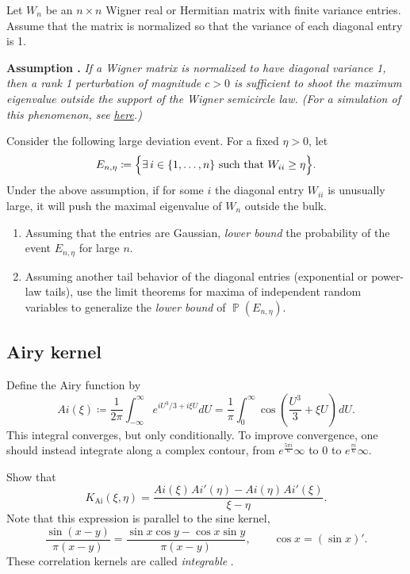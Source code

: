 \documentclass[letterpaper,11pt,oneside,reqno]{article}
\numberwithin{equation}{section}
\newcommand{\ssp}{\hspace{1pt}}
\theoremstyle{definition}
\begin{document}
Let \(W_n\) be an \(n\times n\) Wigner real or Hermitian matrix with finite variance entries. Assume that the matrix is normalized so that the variance of each diagonal entry is 1.

\medskip

\textbf{Assumption \cite{BBP2005phase}.} \textit{If a Wigner matrix is normalized to have diagonal variance 1, then a rank 1 perturbation of magnitude $c>0$ is sufficient to shoot the maximum eigenvalue outside the support of the Wigner semicircle law. (For a simulation of this phenomenon, see \href{https://lpetrov.cc/simulations/2025-01-28-bbp-transition/}{here}.)}

\medskip

Consider the following large deviation event. For a fixed \(\eta>0\), let
\[
E_{n,\eta}\coloneqq \Bigl\{ \exists\, i\in\{1,\dots,n\} \text{ such that } W_{ii}\ge \eta \Bigr\}.
\]
Under the above assumption, if for some \(i\) the diagonal
entry \(W_{ii}\) is unusually large, it will push the
maximal eigenvalue of \(W_n\) outside the bulk.

\begin{enumerate}
	\item Assuming that the
		entries are Gaussian,
		\emph{lower bound} the probability of the event \(E_{n,\eta}\) for large \(n\).
	\item
		Assuming another tail behavior of the diagonal entries (exponential or
		power-law tails),
		use the limit theorems for maxima of independent random variables to generalize the
		\emph{lower bound} of $\operatorname{\mathbb{P}}(E_{n,\eta})$.
\end{enumerate}



\subsection{Airy kernel}
\label{prob:airy}

Define the Airy function by
\begin{equation*}
	Ai(\xi)\coloneqq
	\frac{1}{2\pi}\int_{-\infty}^\infty
	e^{i U^3/3+i\xi U} dU=
	\frac{1}{\pi}\int_0^\infty
	\cos\left( \frac{U^3}{3}+\xi U \right)\ssp dU.
\end{equation*}
This integral converges, but only conditionally. To improve convergence,
one should instead integrate
along a complex contour,
from $e^{\frac{5 \pi i}{6}}\infty$ to $0$ to
$e^{\frac{\pi i}{6}}\infty$.

Show that
\begin{equation*}
	K_{\mathrm{Ai}}(\xi,\eta)=
	\frac{Ai(\xi)\ssp Ai'(\eta)-Ai(\eta)\ssp Ai'(\xi)}{\xi-\eta}.
\end{equation*}
Note that this expression is parallel to the sine kernel,
\begin{equation*}
	\frac{\sin(x-y)}{\pi(x-y)}=\frac{\sin x\cos y-\cos x\sin y}{\pi(x-y)},\qquad
	\cos x=(\sin x)'.
\end{equation*}
These correlation kernels are called \emph{integrable}
\cite{its1990differential}.
\end{document}
